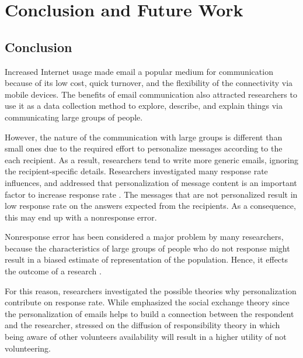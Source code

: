 \chapter{Conclusion and Future Work}
\label{chp:6:ConcFutu}

\section{Conclusion}
\label{sec:6.1:Conc}

Increased Internet usage made email a popular medium for communication because of its low cost, quick turnover, and the flexibility of the connectivity via mobile devices. The benefits of email communication also attracted researchers to use it as a data collection method to explore, describe, and explain things via communicating large groups of people.
\vspace{1cm}

However, the nature of the communication with large groups is different than small ones due to the required effort to personalize messages according to the each recipient. As a result, researchers tend to write more generic emails, ignoring the recipient-specific details. Researchers investigated many response rate influences, and addressed that personalization of message content is an important factor to increase response rate \citep{Dillman1991,Schaefer1998}. The messages that are not personalized result in low response rate on the answers expected from the recipients. As a consequence, this may end up with a nonresponse error.
\vspace{1cm}

Nonresponse error has been considered a major problem by many researchers, because the characteristics of large groups of people who do not response might result in a biased estimate of representation of the population. Hence, it effects the outcome of a research \citep{Bogen1996}.
\vspace{1cm}

For this reason, researchers investigated the possible theories why personalization contribute on response rate. While \cite{DillmanDonA.SmythJoleneD.Christian2009} emphasized the social exchange theory since the personalization of emails helps to build a connection between the respondent and the researcher, \cite{Barron2002} stressed on the diffusion of responsibility theory in which being aware of other volunteers availability will result in a higher utility of not volunteering.
\vspace{1cm}

